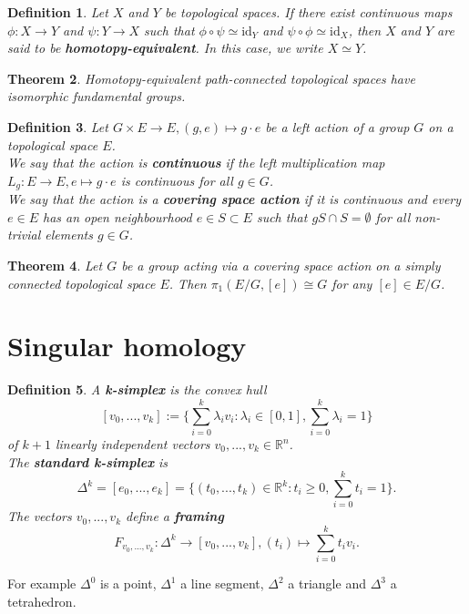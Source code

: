 \documentclass{article}
\newtheorem{theorem}{Theorem}[section]
\newtheorem{definition}[theorem]{Definition}
\begin{document}
\begin{definition}
Let $X$ and $Y$ be topological spaces. If there exist continuous maps $\phi\colon X\to Y$ and $\psi\colon Y\to X$ such that $\phi\circ\psi\simeq\text{id}_Y$ and $\psi\circ\phi\simeq\text{id}_X$, then $X$ and $Y$ are said to be \textbf{homotopy-equivalent}. In this case, we write $X\simeq Y$.
\end{definition}

\begin{theorem}
Homotopy-equivalent path-connected topological spaces have isomorphic fundamental groups.
\end{theorem}

\begin{definition}
Let $G\times E\to E,(g,e)\mapsto g\cdot e$ be a left action of a group $G$ on a topological space $E$.\\
We say that the action is \textbf{continuous} if the left multiplication map $L_g\colon E\to E,e\mapsto g\cdot e$ is continuous for all $g\in G$.\\
We say that the action is a \textbf{covering space action} if it is continuous and every $e\in E$ has an open neighbourhood $e\in S\subset E$ such that $gS\cap S=\emptyset$ for all non-trivial elements $g\in G$.
\end{definition}

\begin{theorem}
Let $G$ be a group acting via a covering space action on a simply connected topological space $E$. Then $\pi_1(E/G,[e])\cong G$ for any $[e]\in E/G$.
\end{theorem}

\section{Singular homology}
\begin{definition}
A \textbf{k-simplex} is the convex hull\[[v_0,...,v_k]:=\{\sum_{i=0}^k\lambda_iv_i:\lambda_i\in [0,1],\sum_{i=0}^k\lambda_i=1\}\]
of $k+1$ linearly independent vectors $v_0,...,v_k\in\mathbb{R}^n$.\\
The \textbf{standard k-simplex} is\[\Delta^k=[e_0,...,e_k]=\{(t_0,...,t_k)\in\mathbb{R}^k:t_i\geq 0, \sum_{i=0}^kt_i=1\}.\]
The vectors $v_0,...,v_k$ define a \textbf{framing} \[F_{v_0,...,v_k}\colon\Delta^k\rightarrow [v_0,...,v_k],(t_i)\mapsto \sum_{i=0}^kt_iv_i.\]
\end{definition}


\noindent For example $\Delta^0$ is a point, $\Delta^1$ a line segment, $\Delta^2$ a triangle and $\Delta^3$ a tetrahedron.
\end{document}
